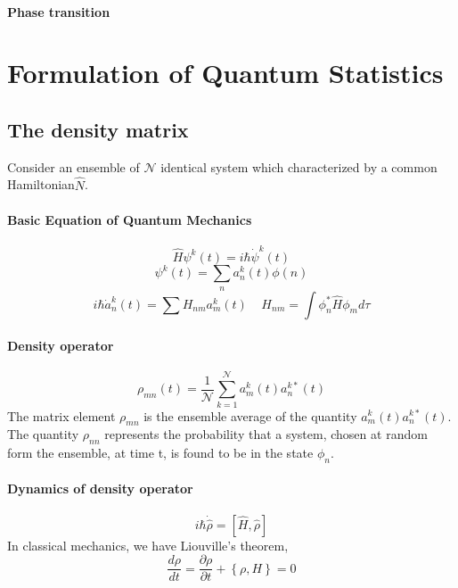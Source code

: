 \documentclass{article}
\begin{document}
\paragraph{Phase transition}

\section{Formulation of Quantum Statistics}

\subsection{The density matrix}
Consider an ensemble of $\mathcal{N}$ identical system which characterized by a common Hamiltonian$\widehat{N}$.
\paragraph{Basic Equation of Quantum Mechanics}
\begin{equation}
\widehat{H} \psi^k(t) = i \hbar \dot{\psi}^k(t)
\end{equation}
\begin{equation}
 \psi^k(t) =\sum_n a_n^k(t) \phi(n)
\end{equation}
\begin{equation}
i \hbar \dot{a}_n^k(t) = \sum H_{nm} a_m^k(t) \ \ \ \ \ H_{nm}=\int \phi^*_n \widehat{H} \phi_m d\tau
\end{equation}

\paragraph{Density operator}
\begin{equation}
\rho_{mn}(t) = \frac{1}{\mathcal{N}} \sum_{k=1}^{\mathcal{N}} a_m^k(t) a_n^{k*}(t)
\end{equation}
The matrix element $\rho_{mn}$ is the ensemble average of the quantity $a_m^k(t) a_n^{k*}(t)$.
The quantity $\rho_{nn}$ represents the probability that a system, chosen at random form the ensemble, at time t, is found to be in the state $\phi_n$.

\paragraph{Dynamics of density operator}
\begin{equation}
i \hbar \dot{\widehat{\rho}} = [\widehat{H},\widehat{\rho}]
\end{equation}
In classical mechanics, we have Liouville's theorem,
\begin{equation}
\frac{d \rho}{dt} = \frac{\partial \rho}{\partial t} + \left\{ \rho, H\right\}=0
\end{equation}
\end{document}
